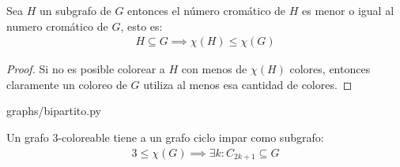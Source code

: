 \begin{lemma}\label{chi_subgrafo}
  Sea $H$ un subgrafo de $G$ entonces el número cromático de $H$ es menor
  o igual al numero cromático de $G$, esto es:
  \begin{align}
    H \subseteq G \implies \chi(H) \le \chi(G)
  \end{align}
\end{lemma}

\begin{proof}
  Si no es posible colorear a $H$ con menos de $\chi(H)$ colores, entonces
  claramente un coloreo de $G$ utiliza al menos esa cantidad de colores.
\end{proof}

\begin{lstinputlisting}[language=python]{graphs/bipartito.py}
\end{lstinputlisting}

\begin{lemma}\label{3colores_cicloimpar}
  Un grafo $3$-coloreable tiene a un grafo ciclo impar como subgrafo:
  \begin{align}
    3 \le \chi(G) \implies \exists k \colon C_{2k+1} \subseteq G 
  \end{align}
\end{lemma}

